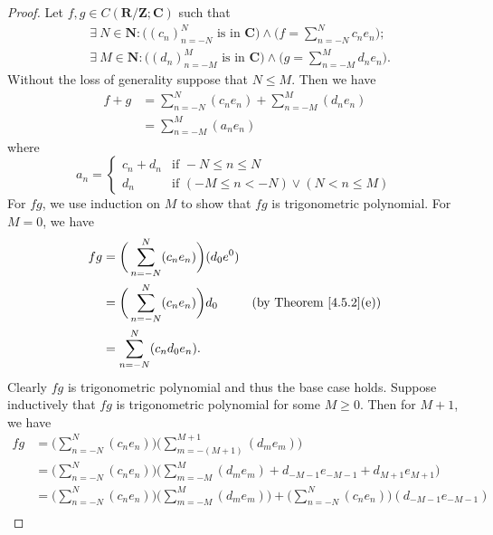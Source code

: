 \begin{proof}
    Let \(f, g \in C(\mathbf{R} / \mathbf{Z} ; \mathbf{C})\) such that
    \begin{align*}
         & \exists\ N \in \mathbf{N} : \big((c_n)_{n = -N}^N \text{ is in } \mathbf{C}\big) \land \bigg(f = \sum_{n = -N}^N c_n e_n\bigg); \\
         & \exists\ M \in \mathbf{N} : \big((d_n)_{n = -M}^M \text{ is in } \mathbf{C}\big) \land \bigg(g = \sum_{n = -M}^M d_n e_n\bigg).
    \end{align*}
    Without the loss of generality suppose that \(N \leq M\).
    Then we have
    \begin{align*}
        f + g & = \sum_{n = -N}^N (c_n e_n) + \sum_{n = -M}^M (d_n e_n) \\
              & = \sum_{n = -M}^M (a_n e_n)
    \end{align*}
    where
    \[
        a_n = \begin{cases}
            c_n + d_n & \text{if } -N \leq n \leq N                     \\
            d_n       & \text{if } (-M \leq n < -N) \lor (N < n \leq M)
        \end{cases}
    \]
    For \(fg\), we use induction on \(M\) to show that \(fg\) is trigonometric polynomial.
    For \(M = 0\), we have
    \begin{align*}
        fg & = \bigg(\sum_{n = -N}^N (c_n e_n)\bigg) (d_0 e^0)                                      \\
           & = \bigg(\sum_{n = -N}^N (c_n e_n)\bigg) d_0       & \text{(by Theorem \ref{4.5.2}(e))} \\
           & = \sum_{n = -N}^N (c_n d_0 e_n).
    \end{align*}
    Clearly \(fg\) is trigonometric polynomial and thus the base case holds.
    Suppose inductively that \(fg\) is trigonometric polynomial for some \(M \geq 0\).
    Then for \(M + 1\), we have
    \begin{align*}
        f g & = \bigg(\sum_{n = -N}^N (c_n e_n)\bigg) \bigg(\sum_{m = -(M + 1)}^{M + 1} (d_m e_m)\bigg)                                                        \\
            & = \bigg(\sum_{n = -N}^N (c_n e_n)\bigg) \bigg(\sum_{m = -M}^M (d_m e_m) + d_{-M - 1} e_{-M - 1} + d_{M + 1} e_{M + 1}\bigg)                      \\
            & = \bigg(\sum_{n = -N}^N (c_n e_n)\bigg) \bigg(\sum_{m = -M}^M (d_m e_m)\bigg) + \bigg(\sum_{n = -N}^N (c_n e_n)\bigg) (d_{-M - 1} e_{-M - 1})    \\

\end{align*}
\end{proof}
